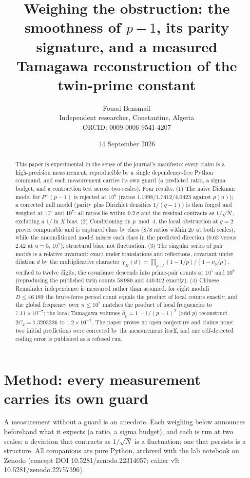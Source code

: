 \documentclass[11pt,a4paper]{article}
\title{\textbf{Weighing the obstruction: the smoothness of $p-1$, its parity
signature, and a measured Tamagawa reconstruction of the twin-prime constant}}
\author{Fouad Bensmail\\ Independent researcher, Constantine, Algeria\\
ORCID: 0009-0006-9541-4207}
\date{14 September 2026}
\theoremstyle{definition}
\begin{document}
\maketitle

\begin{abstract}
This paper is experimental in the sense of the journal's manifesto: every
claim is a high-precision measurement, reproducible by a single
dependency-free Python command, and each measurement carries its own guard
(a predicted ratio, a sigma budget, and a contraction test across two
scales). Four results. (1) The naive Dickman model for $P^+(p-1)$ is rejected
at $10^6$ (ratios $1.1998/1.7412/4.0423$ against $\rho(u)$); a corrected null
model (parity plus Dirichlet densities $1/(q-1)$) is then forged and weighed
at $10^6$ and $10^7$: all ratios lie within $0.2\,\sigma$ and the residual
contracts as $1/\sqrt N$, excluding a $1/\ln X$ bias. (2) Conditioning on
$p \bmod 4$, the local obstruction at $q=2$ proves computable and is captured
class by class (8/8 ratios within $2\sigma$ at both scales), while the
unconditioned model misses each class in the predicted direction
($0.63$ versus $2.42$ at $u=5$, $10^7$): structural bias, not fluctuation.
(3) The singular series of pair motifs is a relative invariant: exact under
translations and reflections, covariant under dilation $d$ by the
multiplicative character $\chi_H(d)=\prod_{p\mid d}(1-1/p)/(1-\nu_p/p)$,
verified to twelve digits; the covariance descends into prime-pair counts at
$10^7$ and $10^8$ (reproducing the published twin counts $58\,980$ and
$440\,312$ exactly). (4) Chinese Remainder independence is measured rather
than assumed: for eight moduli $D\le46\,189$ the brute-force period count
equals the product of local counts exactly, and the global frequency over
$n\le10^7$ matches the product of local frequencies to $7.11\times10^{-7}$;
the local Tamagawa volumes $\beta_p=1-1/(p-1)^2$ (odd $p$) reconstruct
$2C_2=1.3203236$ to $1.2\times10^{-7}$. The paper proves no open conjecture
and claims none: two initial predictions were corrected by the measurement
itself, and one self-detected coding error is published as a refused run.
\end{abstract}

\section{Method: every measurement carries its own guard}
A measurement without a guard is an anecdote. Each weighing below announces
beforehand what it expects (a ratio, a sigma budget), and each is run at two
scales: a deviation that contracts as $1/\sqrt N$ is a fluctuation; one that
persists is a structure. All companions are pure Python, archived with the
lab notebook on Zenodo (concept DOI 10.5281/zenodo.22314057; cahier v9:
10.5281/zenodo.22757396).
\end{document}
